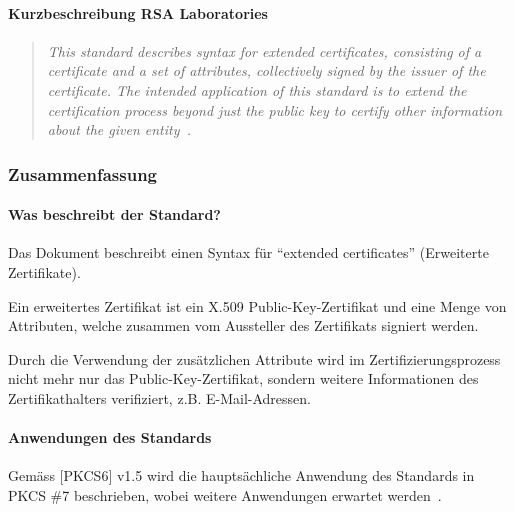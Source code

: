 \documentclass[10pt,a4paper]{article}
\begin{document}
\paragraph{Kurzbeschreibung RSA Laboratories}
\begin{quotation}
    \itshape This standard describes syntax for extended certificates, consisting of a
    certificate and a set of attributes, collectively signed by the issuer of the
    certificate. The intended application of this standard is to extend the certification
    process beyond just the public key to certify other information about the given
    entity~\cite{pkcs6}.
\end{quotation}

\subsubsection{Zusammenfassung}

\paragraph{Was beschreibt der Standard?}
Das Dokument beschreibt einen Syntax für "`extended certificates"' (Erweiterte Zertifikate).

Ein erweitertes Zertifikat ist ein X.509 Public-Key-Zertifikat und eine Menge von
Attributen, welche zusammen vom Aussteller des Zertifikats signiert werden.

Durch die Verwendung der zusätzlichen Attribute wird im Zertifizierungsprozess nicht mehr
nur das Public-Key-Zertifikat, sondern weitere Informationen des Zertifikathalters
verifiziert, z.B. E-Mail-Adressen.

\paragraph{Anwendungen des Standards}
Gemäss [PKCS6] v1.5 wird die hauptsächliche Anwendung des Standards in PKCS \#7
beschrieben, wobei weitere Anwendungen erwartet werden~\cite[S.1]{pkcs6}.
\end{document}
